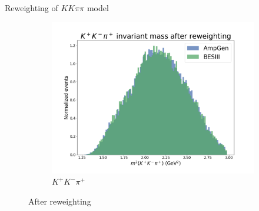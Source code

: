 \documentclass{beamer}
\begin{document}
\begin{frame}{Reweighting of \texorpdfstring{$KK\pi\pi$}{KKpipi} model}
\begin{figure}
\begin{subfigure}{0.33\textwidth}
      \includegraphics[width=\textwidth]{Plots/s012_AfterReweighting.png}
      \caption{$K^+K^-\pi^+$}
    \end{subfigure}
    \caption{After reweighting}
  \end{figure}
\end{frame}
\end{document}
